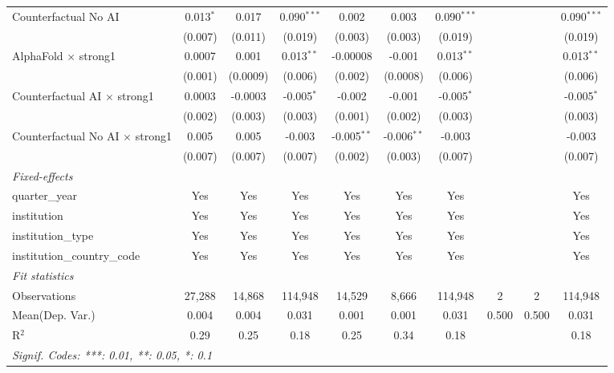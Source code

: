 \begin{tabular}{lccccccccc}
   Counterfactual No AI                   & 0.013$^{*}$ & 0.017    & 0.090$^{***}$ & 0.002         & 0.003         & 0.090$^{***}$ &     &     & 0.090$^{***}$\\   
                                          & (0.007)     & (0.011)  & (0.019)       & (0.003)       & (0.003)       & (0.019)       &     &     & (0.019)\\   
   AlphaFold $\times$ strong1             & 0.0007      & 0.001    & 0.013$^{**}$  & -0.00008      & -0.001        & 0.013$^{**}$  &     &     & 0.013$^{**}$\\   
                                          & (0.001)     & (0.0009) & (0.006)       & (0.002)       & (0.0008)      & (0.006)       &     &     & (0.006)\\   
   Counterfactual AI $\times$ strong1     & 0.0003      & -0.0003  & -0.005$^{*}$  & -0.002        & -0.001        & -0.005$^{*}$  &     &     & -0.005$^{*}$\\   
                                          & (0.002)     & (0.003)  & (0.003)       & (0.001)       & (0.002)       & (0.003)       &     &     & (0.003)\\   
   Counterfactual No AI $\times$ strong1  & 0.005       & 0.005    & -0.003        & -0.005$^{**}$ & -0.006$^{**}$ & -0.003        &     &     & -0.003\\   
                                          & (0.007)     & (0.007)  & (0.007)       & (0.002)       & (0.003)       & (0.007)       &     &     & (0.007)\\   
   \midrule
   \emph{Fixed-effects}\\
   quarter\_year                          & Yes         & Yes      & Yes           & Yes           & Yes           & Yes           &     &     & Yes\\  
   institution                            & Yes         & Yes      & Yes           & Yes           & Yes           & Yes           &     &     & Yes\\  
   institution\_type                      & Yes         & Yes      & Yes           & Yes           & Yes           & Yes           &     &     & Yes\\  
   institution\_country\_code             & Yes         & Yes      & Yes           & Yes           & Yes           & Yes           &     &     & Yes\\  
   \midrule
   \emph{Fit statistics}\\
   Observations                           & 27,288      & 14,868   & 114,948       & 14,529        & 8,666         & 114,948       & 2   & 2   & 114,948\\  
Mean(Dep. Var.) & 0.004 & 0.004 & 0.031 & 0.001 & 0.001 & 0.031 & 0.500 & 0.500 & 0.031 \\
   R$^2$                                  & 0.29        & 0.25     & 0.18          & 0.25          & 0.34          & 0.18          &     &     & 0.18\\  
   \midrule \midrule
   \multicolumn{10}{l}{\emph{Signif. Codes: ***: 0.01, **: 0.05, *: 0.1}}\\
\end{tabular}
\par\endgroup
